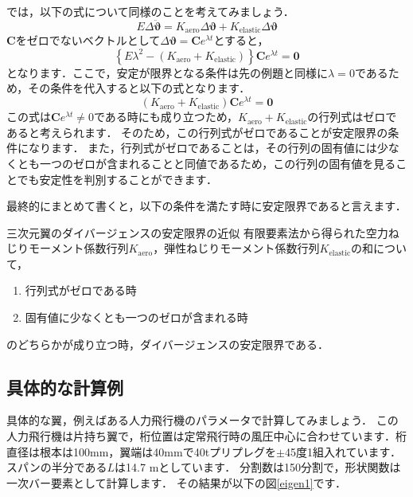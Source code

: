 \documentclass{jarticle}
\begin{document}
では，以下の式について同様のことを考えてみましょう．
\begin{equation}
    E\Delta\ddot{\bm{\vartheta}} = K_\mathrm{aero} \Delta\bm{\vartheta} + K_\mathrm{elastic} \Delta\bm{\vartheta}
\end{equation}
$\bm{C}$をゼロでないベクトルとして$\Delta\bm{\vartheta} = \bm{C}e^{\lambda t}$とすると，
\begin{equation}
    \left\{ E\lambda^2 - (K_\mathrm{aero} + K_\mathrm{elastic}) \right\}\bm{C}e^{\lambda t} = \bm{0}
\end{equation}
となります．ここで，安定が限界となる条件は先の例題と同様に$\lambda = 0$であるため，その条件を代入すると以下の式となります．
\begin{equation}
    (K_\mathrm{aero} + K_\mathrm{elastic})\bm{C}e^{\lambda t} = \bm{0}
\end{equation}
この式は$\bm{C}e^{\lambda t} \neq 0$である時にも成り立つため，$K_\mathrm{aero} + K_\mathrm{elastic}$の行列式はゼロであると考えられます．
そのため，この行列式がゼロであることが安定限界の条件になります．
また，行列式がゼロであることは，その行列の固有値には少なくとも一つのゼロが含まれることと同値であるため，この行列の固有値を見ることでも安定性を判別することができます．

最終的にまとめて書くと，以下の条件を満たす時に安定限界であると言えます．
\begin{itembox}[l]{三次元翼のダイバージェンスの安定限界の近似}
    有限要素法から得られた空力ねじりモーメント係数行列$K_\mathrm{aero}$，弾性ねじりモーメント係数行列$K_\mathrm{elastic}$の和について，
    \begin{enumerate}
        \item 行列式がゼロである時
        \item 固有値に少なくとも一つのゼロが含まれる時
    \end{enumerate}
    のどちらかが成り立つ時，ダイバージェンスの安定限界である．
\end{itembox}


\subsection{具体的な計算例}

具体的な翼，例えばある人力飛行機のパラメータで計算してみましょう．
この人力飛行機は片持ち翼で，桁位置は定常飛行時の風圧中心に合わせています．桁直径は根本は100mm，翼端は40mmで40tプリプレグを$\pm$45度1組入れています．
スパンの半分である$L$は14.7 mとしています．
分割数は150分割で，形状関数は一次バー要素として計算します．
その結果が以下の図\ref{eigen1}です．
\end{document}
